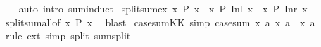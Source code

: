 \begin{isabellebody}
%
\isadelimproof
\ \ %
\endisadelimproof
%
\isatagproof
{}\isamarkupfalse%
\ {\isacharparenleft}{\kern0pt}auto\ intro{\isacharcolon}{\kern0pt}\ sum{\isachardot}{\kern0pt}induct{\isacharparenright}{\kern0pt}%
\endisatagproof
{\isafoldproof}%
%
\isadelimproof
\isanewline
%
\endisadelimproof
\isanewline
{}\isamarkupfalse%
\ split{\isacharunderscore}{\kern0pt}sum{\isacharunderscore}{\kern0pt}ex{\isacharcolon}{\kern0pt}\ {\isachardoublequoteopen}{\isacharparenleft}{\kern0pt}{\isasymexists}x{\isachardot}{\kern0pt}\ P\ x{\isacharparenright}{\kern0pt}\ {\isasymlongleftrightarrow}\ {\isacharparenleft}{\kern0pt}{\isasymexists}x{\isachardot}{\kern0pt}\ P\ {\isacharparenleft}{\kern0pt}Inl\ x{\isacharparenright}{\kern0pt}{\isacharparenright}{\kern0pt}\ {\isasymor}\ {\isacharparenleft}{\kern0pt}{\isasymexists}x{\isachardot}{\kern0pt}\ P\ {\isacharparenleft}{\kern0pt}Inr\ x{\isacharparenright}{\kern0pt}{\isacharparenright}{\kern0pt}{\isachardoublequoteclose}\isanewline
%
\isadelimproof
\ \ %
\endisadelimproof
%
\isatagproof
{}\isamarkupfalse%
\ split{\isacharunderscore}{\kern0pt}sum{\isacharunderscore}{\kern0pt}all{\isacharbrackleft}{\kern0pt}of\ {\isachardoublequoteopen}{\isasymlambda}x{\isachardot}{\kern0pt}\ {\isasymnot}P\ x{\isachardoublequoteclose}{\isacharbrackright}{\kern0pt}\ \isamarkupfalse%
\ blast%
\endisatagproof
{\isafoldproof}%
%
\isadelimproof
%
\endisadelimproof
%
\isadelimdocument
%
\endisadelimdocument
%
\isatagdocument
%
\isamarkuptrue%
%
\endisatagdocument
{\isafolddocument}%
%
\isadelimdocument
%
\endisadelimdocument
{}\isamarkupfalse%
\ case{\isacharunderscore}{\kern0pt}sum{\isacharunderscore}{\kern0pt}KK\ {\isacharbrackleft}{\kern0pt}simp{\isacharbrackright}{\kern0pt}{\isacharcolon}{\kern0pt}\ {\isachardoublequoteopen}case{\isacharunderscore}{\kern0pt}sum\ {\isacharparenleft}{\kern0pt}{\isasymlambda}x{\isachardot}{\kern0pt}\ a{\isacharparenright}{\kern0pt}\ {\isacharparenleft}{\kern0pt}{\isasymlambda}x{\isachardot}{\kern0pt}\ a{\isacharparenright}{\kern0pt}\ {\isacharequal}{\kern0pt}\ {\isacharparenleft}{\kern0pt}{\isasymlambda}x{\isachardot}{\kern0pt}\ a{\isacharparenright}{\kern0pt}{\isachardoublequoteclose}\isanewline
%
\isadelimproof
\ \ %
\endisadelimproof
%
\isatagproof
{}\isamarkupfalse%
\ {\isacharparenleft}{\kern0pt}rule\ ext{\isacharparenright}{\kern0pt}\ {\isacharparenleft}{\kern0pt}simp\ split{\isacharcolon}{\kern0pt}\ sum{\isachardot}{\kern0pt}split{\isacharparenright}{\kern0pt}%
\endisatagproof
{\isafoldproof}%

\end{isabellebody}
